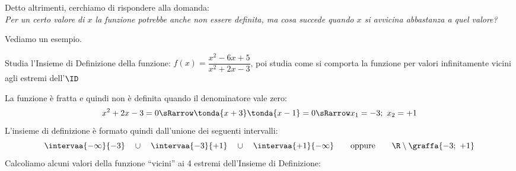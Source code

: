 Detto altrimenti, cerchiamo di rispondere alla domanda: \\
\emph{Per un certo valore di \(x\) la funzione potrebbe anche \emph{non} 
essere definita, ma cosa succede quando \(x\) si avvicina abbastanza a quel 
valore?}

Vediamo un esempio.

\begin{esempio}
 Studia l'Insieme di Definizione della funzione: 
 \(f(x)=\dfrac{x^2-6x+5}{x^2+2x-3}\),\quad
poi studia come si comporta la funzione per valori infinitamente vicini 
agli estremi dell'\(\ID\)

La funzione è fratta e quindi non è definita quando il denominatore vale 
zero:
\[x^2+2x-3=0 \sRarrow \tonda{x+3}\tonda{x-1}=0 \sRarrow x_1=-3;~x_2=+1\]
L'insieme di definizione è formato quindi dall'unione dei seguenti 
intervalli:
\[\intervaa{-\infty}{-3} \quad \cup \quad 
\intervaa{-3}{+1}\quad \cup \quad 
\intervaa{+1}{-\infty} \qquad \text{oppure} \qquad
\R \setminus \graffa{-3;~+1}\]
Calcoliamo alcuni valori della funzione ``vicini'' ai 4 estremi 
dell'Insieme di Definizione:


\end{esempio}
